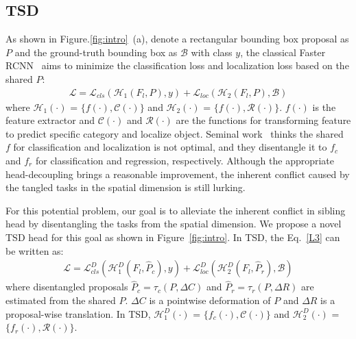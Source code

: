 \documentclass[10pt,twocolumn,letterpaper]{article}
\def \algname{TSD}
\begin{document}
\subsection{\algname}
As shown in Figure.\ref{fig:intro}~(a),
denote a rectangular bounding box proposal as $P$ and the ground-truth bounding box as $\mathcal{B}$ with class ${y}$,
the classical Faster RCNN~\cite{ren2015faster} aims to minimize the classification loss and localization loss based on the shared $P$:
\begin{equation}
\begin{split}
\mathcal{L} = \mathcal{L}_{cls}(\mathcal{H}_1 (F_l, P), y) + \mathcal{L}_{loc}(\mathcal{H}_2(F_l, P), \mathcal{B}) \label{L3}
\end{split}
\end{equation}
where $\mathcal{H}_1(\cdot)$ = $\{f(\cdot), \mathcal{C}(\cdot)\}$ and $\mathcal{H}_2(\cdot)$ = $\{f(\cdot), \mathcal{R}(\cdot)\}$.
$f(\cdot)$ is the feature extractor and $\mathcal{C}(\cdot)$ and $\mathcal{R}(\cdot)$ are the functions for transforming feature to predict specific category and localize object.
Seminal work~\cite{wu2019rethinking} thinks the shared $f$ for classification and localization is not optimal, and they disentangle it to $f_c$ and $f_r$ for classification and regression, respectively. Although the appropriate head-decoupling brings a reasonable improvement, the inherent conflict caused by the tangled tasks in the spatial dimension is still lurking.

For this potential problem, our goal is to alleviate the inherent conflict in sibling head by disentangling the tasks from the spatial dimension. 
We propose a novel \algname{} head for this goal as shown in Figure~\ref{fig:intro}. 
In \algname{}, the Eq.~\ref{L3} can be written as:
\begin{equation}
\begin{split}
\mathcal{L} = \mathcal{L}^D_{cls}(\mathcal{H}^D_1 (F_l, \hat{P}_c), y) + \mathcal{L}^D_{loc}(\mathcal{H}^D_2(F_l, \hat{P}_r), \mathcal{B})
\end{split}
\end{equation}
where disentangled proposals $\hat{P}_c=\tau_c(P,\Delta C)$ and $\hat{P}_r = \tau_r(P,\Delta R)$ are estimated from the shared $P$.
$\Delta C$ is a pointwise deformation of $P$ and $\Delta R$ is a proposal-wise translation.
In \algname{}, $\mathcal{H}^D_1(\cdot)$ = $\{f_c(\cdot), \mathcal{C}(\cdot)\}$ and $\mathcal{H}^D_2(\cdot)$ = $\{f_r(\cdot), \mathcal{R}(\cdot)\}$.
\end{document}
